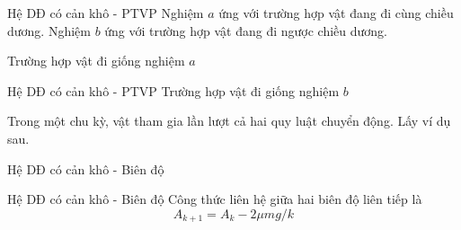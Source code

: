 \begin{frame}{Hệ DĐ có cản khô - PTVP}
    Nghiệm \(a\) ứng với trường hợp vật đang đi cùng chiều dương. Nghiệm \(b\) ứng với trường hợp vật đang đi ngược chiều dương. 
    \vspace{2mm}

    Trường hợp vật đi giống nghiệm \(a\)
    \vspace{5mm}
    
    \begin{center}
        
    \end{center}
\end{frame}
\begin{frame}{Hệ DĐ có cản khô - PTVP}
    Trường hợp vật đi giống nghiệm \(b\)
    \vspace{5mm}
    
    \begin{center}
        
    \end{center}
    Trong một chu kỳ, vật tham gia lần lượt cả hai quy luật chuyển động. Lấy ví dụ sau.

\end{frame}
\begin{frame}{Hệ DĐ có cản khô - Biên độ}
    \begin{center}
        \scalebox{0.6}{}
    \end{center}
\end{frame}
\begin{frame}{Hệ DĐ có cản khô - Biên độ}
    Công thức liên hệ giữa hai biên độ liên tiếp là 
    \begin{equation}
        A_{k+1} = A_k - 2 \mu mg/k
        \label{eq:2.2_4}
    \end{equation}
\end{frame}
